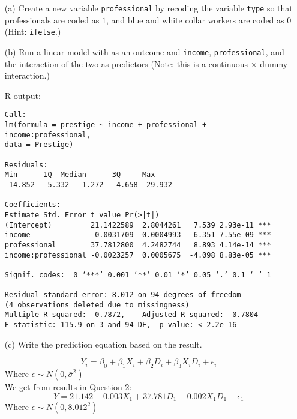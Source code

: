 \documentclass[12pt,letterpaper]{article}
\begin{document}
\newpage
\begin{enumerate}
	
	\item [(a)]
	Create a new variable \texttt{professional} by recoding the variable \texttt{type} so that professionals are coded as $1$, and blue and white collar workers are coded as $0$ (Hint: \texttt{ifelse}.)

		
	\vspace{.5cm}
	
	
	\item [(b)]
	Run a linear model with  as an outcome and \texttt{income}, \texttt{professional}, and the interaction of the two as predictors (Note: this is a continuous $\times$ dummy interaction.)
	
		
	R output: 	

\begin{verbatim}
Call:
lm(formula = prestige ~ income + professional + income:professional, 
data = Prestige)

Residuals:
Min      1Q  Median      3Q     Max 
-14.852  -5.332  -1.272   4.658  29.932 

Coefficients:
Estimate Std. Error t value Pr(>|t|)    
(Intercept)         21.1422589  2.8044261   7.539 2.93e-11 ***
income               0.0031709  0.0004993   6.351 7.55e-09 ***
professional        37.7812800  4.2482744   8.893 4.14e-14 ***
income:professional -0.0023257  0.0005675  -4.098 8.83e-05 ***
---
Signif. codes:  0 ‘***’ 0.001 ‘**’ 0.01 ‘*’ 0.05 ‘.’ 0.1 ‘ ’ 1

Residual standard error: 8.012 on 94 degrees of freedom
(4 observations deleted due to missingness)
Multiple R-squared:  0.7872,	Adjusted R-squared:  0.7804 
F-statistic: 115.9 on 3 and 94 DF,  p-value: < 2.2e-16
\end{verbatim} 
	
	\vspace{.5cm}
	\item [(c)]
	Write the prediction equation based on the result.

	$$Y_i = \beta_0 + \beta_1X_i + \beta_2D_i + \beta_3X_iD_i + \epsilon_i$$ Where $\epsilon \sim N(0, \bar{\sigma}^2)$
	\vspace{.5cm}		
	\\We get from results in Question 2:
	$$Y = 21.142 + 0.003X_1 + 37.781D_1 - 0.002X_1D_1 + {\epsilon_1}$$ Where $\epsilon \sim N(0, 8.012^2)$	
	\vspace{.5cm}
	

\end{enumerate}
\end{document}
